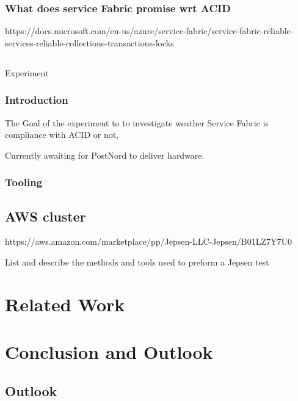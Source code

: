 \documentclass[
  a4paper,  %
  twoside,  %
  bibliography=totoc,
  headsepline,
  cleardoublepage=empty,
  parskip=half,
  draft=false
]{scrbook}
\begin{document}
\subsection{What does service Fabric promise wrt ACID}

https://docs.microsoft.com/en-us/azure/service-fabric/service-fabric-reliable-services-reliable-collections-transactions-locks


\section{}{Experiment}

\subsection{Introduction}

The Goal of the experiment to to investigate weather Service Fabric is compliance with ACID or not, 

Currently awaiting for PostNord to deliver hardware.


\subsection{Tooling}

\section{AWS cluster}
https://aws.amazon.com/marketplace/pp/Jepsen-LLC-Jepsen/B01LZ7Y7U0


List and describe the methods and tools used to preform a Jepsen test



\chapter{Related Work}

\chapter{Conclusion and Outlook}
\label{chap:zusfas}

\section*{Outlook}

\printbibliography
\end{document}
